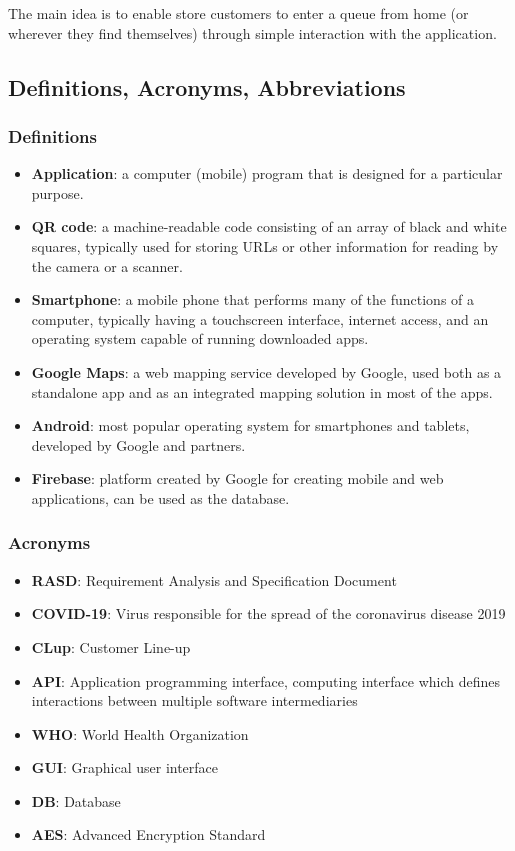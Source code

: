 The main idea is to enable store customers to enter a queue from home (or wherever they find themselves) through simple interaction with the application. 

\newpage

\subsection{Definitions, Acronyms, Abbreviations}
\subsubsection{Definitions}
\begin{itemize} 
	\item \textbf{Application}: a computer (mobile) program that is designed for a particular purpose. 
	\item \textbf{QR code}: a machine-readable code consisting of an array of black and white squares, typically used for storing URLs or other information for reading by the camera or a scanner. 
	\item \textbf{Smartphone}: a mobile phone that performs many of the functions of a computer, typically having a touchscreen interface, internet access, and an operating system capable of running downloaded apps. 
	\item \textbf{Google Maps}: a web mapping service developed by Google, used both as a standalone app and as an integrated mapping solution in most of the apps.
	\item \textbf{Android}: most popular operating system for smartphones and tablets, developed by Google and partners.
	\item \textbf{Firebase}: platform created by Google for creating mobile and web applications, can be used as the database.
\end{itemize}
\subsubsection{Acronyms}
\begin{itemize}
	\item \textbf{RASD}: Requirement Analysis and Specification Document
	\item \textbf{COVID-19}: Virus responsible for the spread of the coronavirus disease 2019
	\item \textbf{CLup}: Customer Line-up
	\item \textbf{API}: Application programming interface, computing interface which defines interactions between multiple software intermediaries 
	\item \textbf{WHO}: World Health Organization
	\item \textbf{GUI}: Graphical user interface
	\item \textbf{DB}: Database
	\item \textbf{AES}: Advanced Encryption Standard
\end{itemize}
